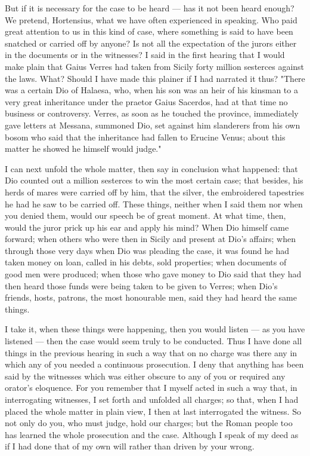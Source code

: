  But if it is necessary for the case to be heard --- has it not been heard enough? We pretend, Hortensius, what we have often experienced in speaking. Who paid great attention to us in this kind of case, where something is said to have been snatched or carried off by anyone? Is not all the expectation of the jurors either in the documents or in the witnesses? I said in the first hearing that I would make plain that Gaius Verres had taken from Sicily forty million sesterces against the laws. What? Should I have made this plainer if I had narrated it thus? "There was a certain Dio of Halaesa, who, when his son was an heir of his kinsman to a very great inheritance under the praetor Gaius Sacerdos, had at that time no business or controversy. Verres, as soon as he touched the province, immediately gave letters at Messana, summoned Dio, set against him slanderers from his own bosom who said that the inheritance had fallen to Erucine Venus; about this matter he showed he himself would judge."

 I can next unfold the whole matter, then say in conclusion what happened: that Dio counted out a million sesterces to win the most certain case; that besides, his herds of mares were carried off by him, that the silver, the embroidered tapestries he had he saw to be carried off. These things, neither when I said them nor when you denied them, would our speech be of great moment. At what time, then, would the juror prick up his ear and apply his mind? When Dio himself came forward; when others who were then in Sicily and present at Dio's affairs; when through those very days when Dio was pleading the case, it was found he had taken money on loan, called in his debts, sold properties; when documents of good men were produced; when those who gave money to Dio said that they had then heard those funds were being taken to be given to Verres; when Dio's friends, hosts, patrons, the most honourable men, said they had heard the same things.

 I take it, when these things were happening, then you would listen --- as you have listened --- then the case would seem truly to be conducted. Thus I have done all things in the previous hearing in such a way that on no charge was there any in which any of you needed a continuous prosecution. I deny that anything has been said by the witnesses which was either obscure to any of you or required any orator's eloquence. For you remember that I myself acted in such a way that, in interrogating witnesses, I set forth and unfolded all charges; so that, when I had placed the whole matter in plain view, I then at last interrogated the witness. So not only do you, who must judge, hold our charges; but the Roman people too has learned the whole prosecution and the case. Although I speak of my deed as if I had done that of my own will rather than driven by your wrong.

